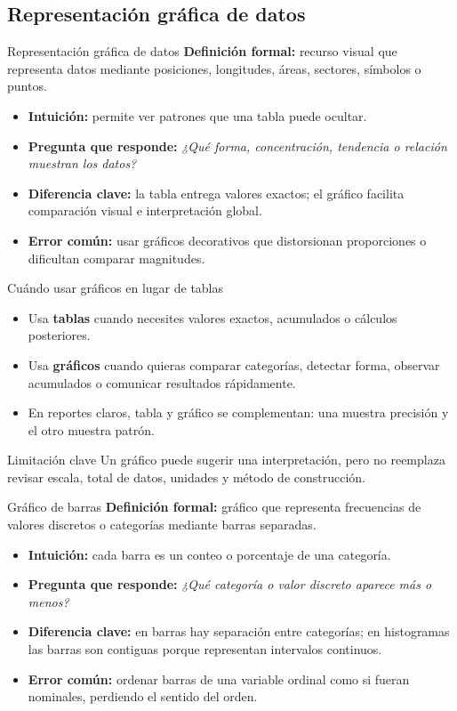 \documentclass[aspectratio=169,11pt]{beamer}
\newcommand{\pregunta}[1]{\textbf{Pregunta que responde:} \emph{#1}}
\newcommand{\errorcomun}[1]{\textbf{Error común:} #1}
\newcommand{\diferencia}[1]{\textbf{Diferencia clave:} #1}
\begin{document}
\subsection{Representación gráfica de datos}

\begin{frame}{Representación gráfica de datos}
\textbf{Definición formal:} recurso visual que representa datos mediante posiciones, longitudes, áreas, sectores, símbolos o puntos.
\begin{itemize}
  \item \textbf{Intuición:} permite ver patrones que una tabla puede ocultar.
  \item \pregunta{¿Qué forma, concentración, tendencia o relación muestran los datos?}
  \item \diferencia{la tabla entrega valores exactos; el gráfico facilita comparación visual e interpretación global.}
  \item \errorcomun{usar gráficos decorativos que distorsionan proporciones o dificultan comparar magnitudes.}
\end{itemize}
\end{frame}

\begin{frame}{Cuándo usar gráficos en lugar de tablas}
\begin{itemize}
  \item Usa \textbf{tablas} cuando necesites valores exactos, acumulados o cálculos posteriores.
  \item Usa \textbf{gráficos} cuando quieras comparar categorías, detectar forma, observar acumulados o comunicar resultados rápidamente.
  \item En reportes claros, tabla y gráfico se complementan: una muestra precisión y el otro muestra patrón.
\end{itemize}
\begin{block}{Limitación clave}
Un gráfico puede sugerir una interpretación, pero no reemplaza revisar escala, total de datos, unidades y método de construcción.
\end{block}
\end{frame}

\begin{frame}{Gráfico de barras}
\textbf{Definición formal:} gráfico que representa frecuencias de valores discretos o categorías mediante barras separadas.
\begin{itemize}
  \item \textbf{Intuición:} cada barra es un conteo o porcentaje de una categoría.
  \item \pregunta{¿Qué categoría o valor discreto aparece más o menos?}
  \item \diferencia{en barras hay separación entre categorías; en histogramas las barras son contiguas porque representan intervalos continuos.}
  \item \errorcomun{ordenar barras de una variable ordinal como si fueran nominales, perdiendo el sentido del orden.}
\end{itemize}
\end{frame}
\end{document}

